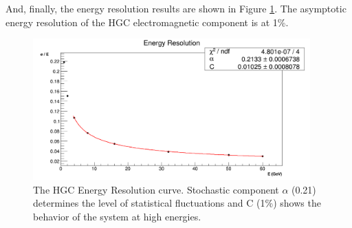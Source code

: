 And, finally, the energy resolution results are shown in Figure \ref{fig:simulations_hgc_pbresolution}. The asymptotic energy resolution of the HGC electromagnetic component is at 1\%.
 \begin{figure}[htbp]
    \centering
    \includegraphics[width=0.95\textwidth]{figures/ch_simulations/hgc/performance/Pb/Resolution.png}
    \caption{The {\sc HGC} Energy Resolution curve. Stochastic component $\alpha$ (0.21) determines the level of statistical fluctuations and C (1\%) shows the behavior of the system at high energies.}
    \label{fig:simulations_hgc_pbresolution}
 \end{figure}
